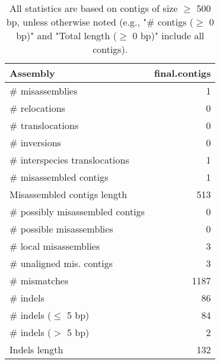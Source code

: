 \documentclass[12pt,a4paper]{article}
\begin{document}
\begin{table}[ht]
\begin{center}
\caption{All statistics are based on contigs of size $\geq$ 500 bp, unless otherwise noted (e.g., "\# contigs ($\geq$ 0 bp)" and "Total length ($\geq$ 0 bp)" include all contigs).}
\begin{tabular}{|l*{1}{|r}|}
\hline
Assembly & final.contigs \\ \hline
\# misassemblies & 1 \\ \hline
\hspace{5mm}\# relocations & 0 \\ \hline
\hspace{5mm}\# translocations & 0 \\ \hline
\hspace{5mm}\# inversions & 0 \\ \hline
\hspace{5mm}\# interspecies translocations & 1 \\ \hline
\# misassembled contigs & 1 \\ \hline
Misassembled contigs length & 513 \\ \hline
\# possibly misassembled contigs & 0 \\ \hline
\hspace{5mm}\# possible misassemblies & 0 \\ \hline
\# local misassemblies & 3 \\ \hline
\# unaligned mis. contigs & 3 \\ \hline
\# mismatches & 1187 \\ \hline
\# indels & 86 \\ \hline
\hspace{5mm}\# indels ($\leq$ 5 bp) & 84 \\ \hline
\hspace{5mm}\# indels ($>$ 5 bp) & 2 \\ \hline
Indels length & 132 \\ \hline
\end{tabular}
\end{center}
\end{table}
\end{document}
